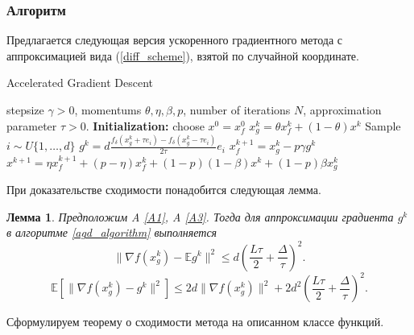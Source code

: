 \documentclass{article}
\newtheorem{lemma}{Лемма}
\begin{document}
\subsubsection{Алгоритм}
Предлагается следующая версия ускоренного градиентного метода с аппроксимацией вида (\ref{diff_scheme}), взятой по случайной координате.
\begin{algorithm}[!ht]
\caption{ Accelerated Gradient Descent }\label{agd_algorithm}
\begin{algorithmic}[1]
   \REQUIRE stepsize $\gamma > 0$, momentums $\theta, \eta, \beta, p$, number of iterations $N$, approximation parameter $\tau > 0$.
   \textbf{Initialization:} choose $x^0 = x_f^0$
		\STATE $x_g^k = \theta x_f^k + (1 - \theta)x^k$
		\STATE Sample $i \sim U\{1, \dots, d\}$
		\STATE $g^k = d\frac{f_\delta(x_g^k + \tau e_i) - f_\delta(x_g^k - \tau e_i)}{2\tau}e_i$
		\STATE $x_f^{k + 1} = x_g^k - p \gamma g^k$
		\STATE $x^{k + 1} = \eta x_f^{k + 1} + (p - \eta) x_f^k + (1 - p)(1 - \beta) x^k + (1 - p)\beta x_g^k$
   \ENDFOR
\end{algorithmic}
\end{algorithm}

При доказательстве сходимости понадобится следующая лемма.
\begin{lemma}\label{lemma1}
 Предположим A \ref{A1}, A \ref{A3}. Тогда для аппроксимации градиента $g^k$ в алгоритме \ref{agd_algorithm} выполняется
 \begin{equation}
  \|\nabla f(x_g^k) - \mathbb{E}g^k\|^2 \leqslant d \left(\frac{L\tau}{2} + \frac{\Delta}{\tau}\right)^2.
  \label{norm_of_expectation}
 \end{equation}
 \begin{equation}
  \mathbb{E}[\|\nabla f(x_g^k) - g^k\|^2] \leqslant 2d \|\nabla f(x_g^k)\|^2 + 2 d^2 \left(\frac{L\tau}{2} + \frac{\Delta}{\tau}\right)^2.
  \label{expectation_of_norm}
 \end{equation}
\end{lemma}

Сформулируем теорему о сходимости метода на описанном классе функций.
\end{document}
